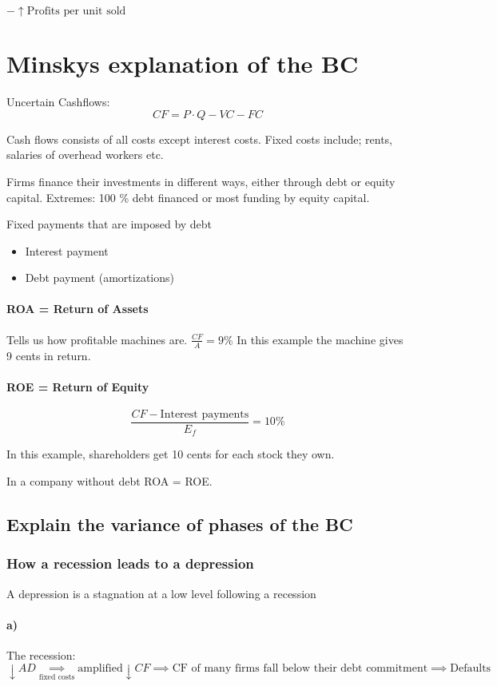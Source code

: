 \documentclass{report}
\begin{document}
$ - \uparrow \text{Profits per unit sold} $

\section{Minskys explanation of the BC} 

Uncertain Cashflows:
$$CF = P \cdot Q - VC - FC$$

Cash flows consists of all costs except interest costs. Fixed costs include; rents, salaries of overhead workers etc. 

Firms finance their investments in different ways, either through debt or equity capital.
Extremes:
100 \% debt financed or most funding by equity capital. 


Fixed payments that are imposed by debt
\begin{itemize}
    \item Interest payment
    \item Debt payment (amortizations)
\end{itemize}

\paragraph{ROA = Return of Assets}  Tells us how profitable machines are. $\frac{CF}{A} = 9\%$ In this example the machine gives 9 cents in return.

\paragraph{ROE = Return of Equity}  

$$\frac{CF - \text{Interest payments}}{E_f} = 10 \%$$

In this example, shareholders get 10 cents for each stock they own. 

In a company without debt ROA = ROE.

\subsection{Explain the variance of phases of the BC}

\subsubsection{How a recession leads to a depression}

A depression is a stagnation at a low level following a recession
\paragraph{a)} The recession:
$$\downarrow AD \underset{\text{fixed costs}}{\implies} \text{amplified} \downarrow CF \implies \text{CF of many firms fall below their debt commitment} \implies \text{Defaults}$$
\end{document}
